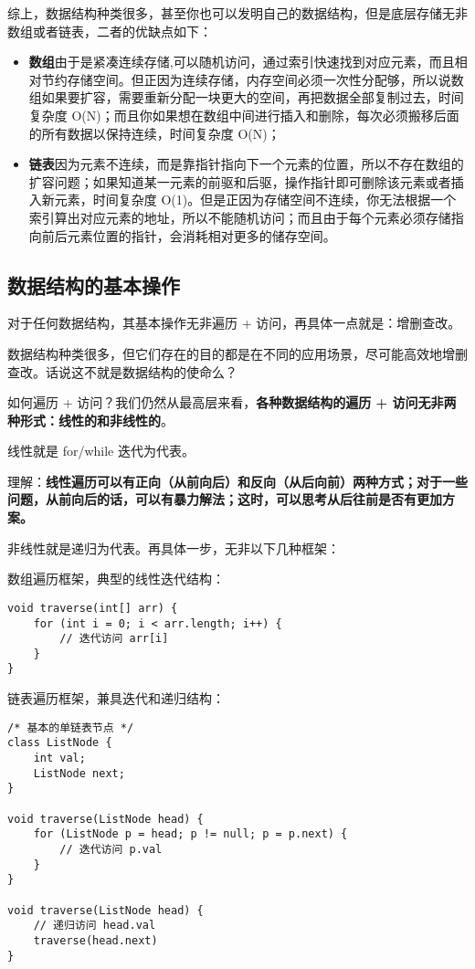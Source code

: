 \documentclass[12pt]{article}
\begin{document}
综上，数据结构种类很多，甚至你也可以发明自己的数据结构，但是底层存储无非数组或者链表，二者的优缺点如下：
\begin{itemize}
\setlength{\itemsep}{0pt}
\setlength{\parsep}{0pt}
\setlength{\parskip}{0pt}
    \item \textbf{数组}由于是紧凑连续存储,可以随机访问，通过索引快速找到对应元素，而且相对节约存储空间。但正因为连续存储，内存空间必须一次性分配够，所以说数组如果要扩容，需要重新分配一块更大的空间，再把数据全部复制过去，时间复杂度 O(N)；而且你如果想在数组中间进行插入和删除，每次必须搬移后面的所有数据以保持连续，时间复杂度 O(N)；
    \item \textbf{链表}因为元素不连续，而是靠指针指向下一个元素的位置，所以不存在数组的扩容问题；如果知道某一元素的前驱和后驱，操作指针即可删除该元素或者插入新元素，时间复杂度 O(1)。但是正因为存储空间不连续，你无法根据一个索引算出对应元素的地址，所以不能随机访问；而且由于每个元素必须存储指向前后元素位置的指针，会消耗相对更多的储存空间。
\end{itemize}

\subsection{数据结构的基本操作}
对于任何数据结构，其基本操作无非遍历 + 访问，再具体一点就是：增删查改。

数据结构种类很多，但它们存在的目的都是在不同的应用场景，尽可能高效地增删查改。话说这不就是数据结构的使命么？

如何遍历 + 访问？我们仍然从最高层来看，\textbf{各种数据结构的遍历 + 访问无非两种形式：线性的和非线性的}。

线性就是 for/while 迭代为代表。
\begin{framed}
理解：\textbf{线性遍历可以有正向（从前向后）和反向（从后向前）两种方式；对于一些问题，从前向后的话，可以有暴力解法；这时，可以思考从后往前是否有更加方案。}
\end{framed}

非线性就是递归为代表。再具体一步，无非以下几种框架：

数组遍历框架，典型的线性迭代结构：
\begin{lstlisting}
void traverse(int[] arr) {
    for (int i = 0; i < arr.length; i++) {
        // 迭代访问 arr[i]
    }
}
\end{lstlisting}

链表遍历框架，兼具迭代和递归结构：
\begin{lstlisting}
/* 基本的单链表节点 */
class ListNode {
    int val;
    ListNode next;
}

void traverse(ListNode head) {
    for (ListNode p = head; p != null; p = p.next) {
        // 迭代访问 p.val
    }
}

void traverse(ListNode head) {
    // 递归访问 head.val
    traverse(head.next)
}
\end{lstlisting}
\end{document}
